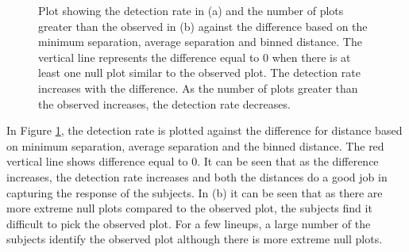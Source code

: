 \documentclass[12]{article}
\begin{document}
\begin{figure}[hbtp]
\centering
{}
	\vspace{-.1in}
\caption[Optional caption for list of figures]{ Plot showing the detection rate in (a) and the number of plots greater than the observed in (b) against the difference based on the minimum separation, average separation and binned distance. The vertical line represents the difference equal to 0 when there is at least one null plot similar to the observed plot. The detection rate increases with the difference. As the number of plots greater than the observed increases, the detection rate decreases. }
\label{lp-comp}
\end{figure}

In Figure \ref{lp-comp}, the detection rate is plotted against the difference for distance based on minimum separation, average separation and the binned distance. The red vertical line shows difference equal to 0.  It can be seen that as the difference increases, the detection rate increases and both the distances do a good job in capturing the response of the subjects.  In (b) it can be seen that as there are more extreme null plots compared to the observed plot, the subjects find it difficult to pick the observed plot. For a few lineups, a large number of the subjects identify the observed plot although there is more extreme null plots. 
\end{document}
